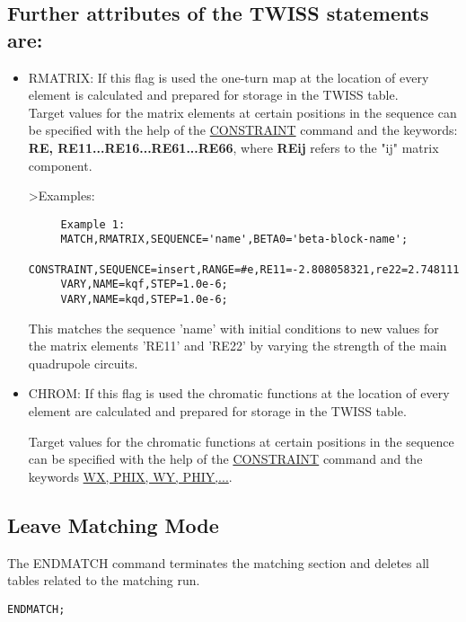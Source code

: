 \subsection{Further attributes of the TWISS statements are:}

\begin{itemize}
	\item 
 RMATRIX: If this flag is used the one-turn map at the location of every
 element is calculated and prepared for storage in the TWISS table.
\\Target values for the matrix elements at certain positions in the sequence
 can be specified with the help of the \href{match_con.html#constraint}{CONSTRAINT}
 command and the
 keywords: \textbf{RE, RE11...RE16...RE61...RE66}, where \textbf{REij} refers
 to the "ij" matrix component.
  
\textgreater Examples:
 
\begin{verbatim}
     Example 1:
     MATCH,RMATRIX,SEQUENCE='name',BETA0='beta-block-name';
     CONSTRAINT,SEQUENCE=insert,RANGE=#e,RE11=-2.808058321,re22=2.748111197;
     VARY,NAME=kqf,STEP=1.0e-6;
     VARY,NAME=kqd,STEP=1.0e-6;
\end{verbatim}

This matches the sequence 'name' with initial conditions to new values
for the matrix elements 'RE11' and 'RE22' by varying the strength of the
main quadrupole circuits.
\end{itemize}

\begin{itemize}
	\item 
CHROM: If this flag is used the chromatic functions at the location of
every element are calculated and prepared for storage in the TWISS
table. 

Target values for the chromatic functions at certain positions in the
sequence can be specified with the help of the
\href{match_con.html#constraint}{CONSTRAINT} command and the keywords
\href{../Introduction/tables.html#normal}{WX, PHIX, WY, PHIY,...}. 
\end{itemize}

\subsection{Leave Matching Mode}
 
The ENDMATCH command terminates the matching section and deletes all tables related to the matching run.
\begin{verbatim}
ENDMATCH;
\end{verbatim}



